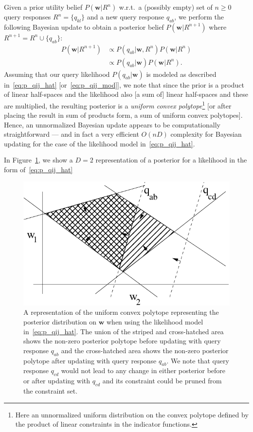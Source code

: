 \documentclass[letterpaper]{article}
\renewcommand{\vec}[1]{\mathbf{#1}}
\begin{document}
Given a prior utility belief $P(\vec{w}|R^n)$ w.r.t.\ a
(possibly empty) set of $n \geq 0$ query responses $R^n = \{ q_{kl}
\}$ and a new query response $q_{ab}$, we perform the following
Bayesian update to obtain a posterior belief $P(\vec{w}|R^{n+1})$
where $R^{n+1} = R^n \cup \{ q_{ab} \}$:
\begin{align}
P(\vec{w}|R^{n+1}) & \propto P(q_{ab}|\vec{w},R^n) P(\vec{w}|R^n) \nonumber \\
                   & \propto P(q_{ab}|\vec{w}) P(\vec{w}|R^n). \label{eq:bayes_update}
\end{align}
Assuming that our query likelihood $P(q_{ab}|\vec{w})$ is modeled as
described in~\eqref{eq:p_qij_hat} [or~\eqref{eq:p_qij_mod}], we note
that since the prior is a product of linear half-spaces and the
likelihood also [a sum of] linear half-spaces and these are
multiplied, the resulting posterior is a \emph{uniform convex
polytope}\footnote{Here an unnormalized uniform distribution on the
convex polytope defined by the product of linear constraints in the
indicator functions.} [or after placing the result in sum of products
form, a sum of uniform convex polytopes].  Hence, an unnormalized
Bayesian update appears to be computationally straightforward --- 
and in fact a 
very efficient $O(nD)$ complexity for Bayesian updating 
for the case of the likelihood model in~\eqref{eq:p_qij_hat}.

In Figure~\ref{fig:polytope}, we show a $D=2$ representation of a
posterior for a likelihood in the form of~\eqref{eq:p_qij_hat}

\begin{figure}[t!]
\begin{center}
\vspace{-1mm}
\includegraphics[width=.4\textwidth]{polytope}
\end{center}
\vspace{-4mm}
\caption{\footnotesize A representation of the uniform convex polytope
representing the posterior distribution on $\vec{w}$ when using the
likelihood model in~\eqref{eq:p_qij_hat}.  The union of the 
striped and cross-hatched area shows 
the non-zero posterior polytope before updating with query response
$q_{ab}$ and the cross-hatched area shows the non-zero posterior
polytope after updating with query response $q_{ab}$.  We note that
query response $q_{cd}$ would not lead to any change in either 
posterior before or after updating with $q_{cd}$ and its constraint
could be pruned from the constraint set.} \label{fig:polytope}
\end{figure}
\end{document}
